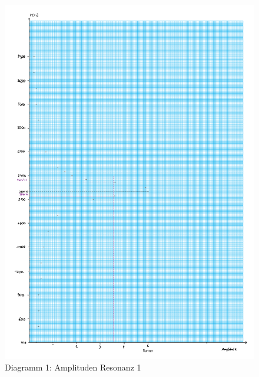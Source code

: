 \begin{figure}[h!]
    \centering
    \includegraphics[page=1, width=.95\textwidth,]{Dias13.pdf}
    \caption{Diagramm 1: Amplituden Resonanz 1}
\end{figure}
\clearpage
\newpage
